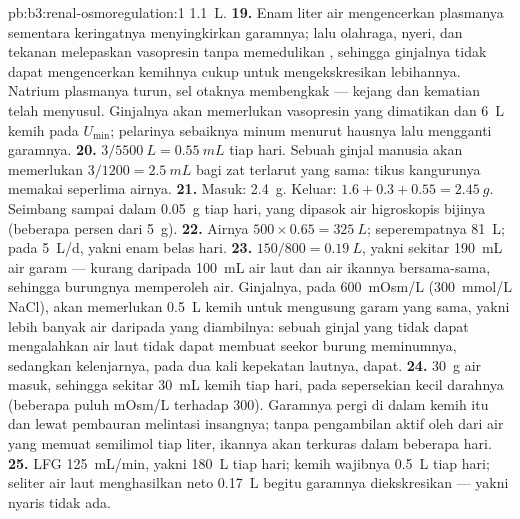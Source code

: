 \begin{solution}{pb:b3:renal-osmoregulation:1}
\qty{1.1}{L}.
\textbf{19.} Enam liter air mengencerkan plasmanya sementara keringatnya menyingkirkan
garamnya; lalu olahraga, nyeri, dan tekanan melepaskan vasopresin tanpa memedulikan
, sehingga ginjalnya tidak dapat mengencerkan kemihnya cukup untuk mengekskresikan
lebihannya. Natrium plasmanya turun, sel otaknya membengkak --- kejang dan kematian
telah menyusul. Ginjalnya akan memerlukan vasopresin yang dimatikan dan
\qty{6}{L} kemih pada $U_{\min}$; pelarinya sebaiknya minum menurut hausnya lalu
mengganti garamnya.
\textbf{20.} $3/5500\ \unit{L} = \qty{0.55}{mL}$ tiap hari. Sebuah ginjal manusia
akan memerlukan $3/1200 = \qty{2.5}{mL}$ bagi zat terlarut yang sama: tikus
kangurunya memakai seperlima airnya.
\textbf{21.} Masuk: \qty{2.4}{g}. Keluar: $1.6 + 0.3 + 0.55 = \qty{2.45}{g}$.
Seimbang sampai dalam \qty{0.05}{g} tiap hari, yang dipasok air higroskopis
bijinya (beberapa persen dari \qty{5}{g}).
\textbf{22.} Airnya $500\times 0.65 = \qty{325}{L}$; seperempatnya
\qty{81}{L}; pada \qty{5}{L/d}, yakni enam belas hari.
\textbf{23.} $150/800 = \qty{0.19}{L}$, yakni sekitar \qty{190}{mL} air garam
--- kurang daripada \qty{100}{mL} air laut dan air ikannya
bersama-sama, sehingga burungnya memperoleh air. Ginjalnya, pada \qty{600}{mOsm/L}
(\qty{300}{mmol/L} NaCl), akan memerlukan \qty{0.5}{L} kemih untuk mengusung
garam yang sama, yakni lebih banyak air daripada yang diambilnya: sebuah ginjal yang tidak dapat mengalahkan
air laut tidak dapat membuat seekor burung meminumnya, sedangkan kelenjarnya, pada dua kali
kepekatan lautnya, dapat.
\textbf{24.} \qty{30}{g} air masuk, sehingga sekitar \qty{30}{mL} kemih tiap
hari, pada sepersekian kecil  darahnya (beberapa puluh
mOsm/L terhadap \num{300}). Garamnya pergi di dalam kemih itu dan lewat pembauran
melintasi insangnya; tanpa pengambilan aktif oleh  dari
air yang memuat semilimol tiap liter, ikannya akan terkuras dalam
beberapa hari.
\textbf{25.} LFG \qty{125}{mL/min}, yakni \qty{180}{L} tiap hari; kemih
wajibnya \qty{0.5}{L} tiap hari; seliter air laut menghasilkan neto
\qty{0.17}{L} begitu garamnya diekskresikan --- yakni nyaris tidak ada.
\end{solution}
